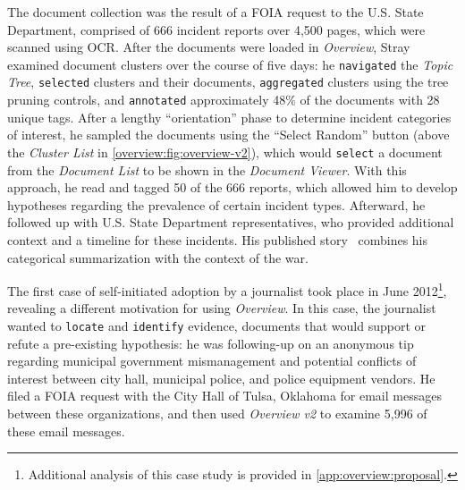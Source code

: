 The document collection was the result of a \ac{FOIA} request to the U.S. State Department, comprised of 666 incident reports over 4,500 pages, which were scanned using \ac{OCR}.
After the documents were loaded in {\it Overview}, Stray examined document clusters over the course of five days: he {\tt navigated} the {\it Topic Tree}, {\tt selected} clusters and their documents, {\tt aggregated} clusters using the tree pruning controls, and {\tt annotated} approximately 48\% of the documents with 28 unique tags.
After a lengthy ``orientation'' phase to determine incident categories of interest, he sampled the documents using the ``Select Random'' button (above the {\it Cluster List} in \autoref{overview:fig:overview-v2}), which would {\tt select} a document from the {\it Document List} to be shown in the {\it Document Viewer}.
With this approach, he read and tagged 50 of the 666 reports, which allowed him to develop hypotheses regarding the prevalence of certain incident types.
Afterward, he followed up with U.S. State Department representatives, who provided additional context and a timeline for these incidents.
His published story~\cite{Stray2012} combines his categorical summarization with the context of the war.

The first case of self-initiated adoption by a journalist took place in June 2012\footnote{Additional analysis of this case study is provided in \autoref{app:overview:proposal}.}, revealing a different motivation for using {\it Overview}.
In this case, the journalist wanted to {\tt locate} and {\tt identify} evidence, documents that would support or refute a pre-existing hypothesis: he was following-up on an anonymous tip regarding municipal government mismanagement and potential conflicts of interest between city hall, municipal police, and police equipment vendors.
He filed a \ac{FOIA} request with the City Hall of Tulsa, Oklahoma for email messages between these organizations, and then used {\it Overview v2} to examine 5,996 of these email messages.

